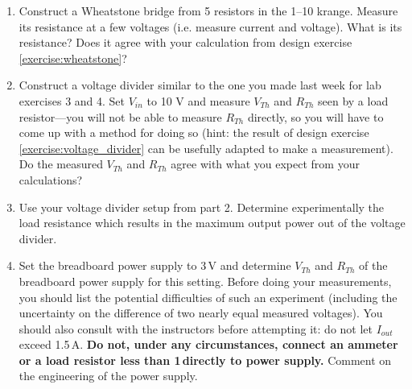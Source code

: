 \documentclass{article}
\begin{document}
\begin{enumerate}
\item Construct a Wheatstone bridge from 5 resistors in the 1--10 k\Ohm range. Measure its resistance at a few voltages (i.e. measure current and voltage). What is its resistance? Does it agree with your calculation from design exercise \ref{exercise:wheatstone}? 
\item Construct a voltage divider similar to the one you made last week for lab exercises 3 and 4. Set $V_{in}$ to 10 V and measure $V_{Th}$ and $R_{Th}$ seen by a load resistor---you will not be able to measure $R_{Th}$ directly, so you will have to come up with a method for doing so (hint: the result of design exercise \ref{exercise:voltage_divider} can be usefully adapted to make a measurement). Do the measured $V_{Th}$ and $R_{Th}$ agree with what you expect from your calculations?
\item Use your voltage divider setup from part 2. Determine experimentally the load resistance which results in the maximum output power out of the voltage divider.
\item Set the breadboard power supply to 3\,V and determine $V_{Th}$ and $R_{Th}$ of the breadboard power supply for this setting. Before doing your measurements, you should list the potential difficulties of such an experiment (including the uncertainty on the difference of two nearly equal measured voltages). You should also consult with the instructors before attempting it: do not let $I_{out}$ exceed 1.5\,A.  \textbf{Do not, under any circumstances, connect an ammeter or a load resistor less than 1\,\Ohm directly to power supply.}  Comment on the engineering of the power supply. 
\end{enumerate}
\end{document}
